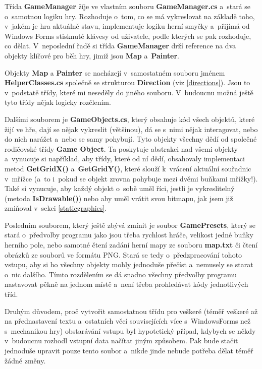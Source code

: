 \documentclass{article}
\begin{document}
Třída \textbf{GameManager} žíje ve vlastním souboru \textbf{GameManager.cs} a~stará se o~samotnou logiku hry. Rozhoduje o~tom, co se má vykreslovat na základě toho, v~jakém je hra aktuálně stavu, implementuje logiku herní smyčky a~přijímá od Windows Forms stisknuté klávesy od uživatele, podle kterých se pak rozhoduje, co dělat. V~neposlední řadě si třída \textbf{GameManager} drží reference na dva objekty klíčové pro běh hry, jimiž jsou \textbf{Map} a~\textbf{Painter}.

Objekty \textbf{Map} a \textbf{Painter} se nacházejí v~samostatném souboru jménem \textbf{HelperClasses.cs} společně se strukturou \textbf{Direction} (viz \ref{directions}). Jsou to v~podstatě třídy, které mi neseděly do jiného souboru. V~budoucnu možná ještě tyto třídy nějak logicky rozčlením. 

Dalšími souborem je \textbf{GameObjects.cs}, který obsahuje kód všech objektů, které žijí ve hře, dají se nějak vykreslit (většinou), dá se s~nimi nějak interagovat, nebo do nich narážet a~nebo se samy pohybují. Tyto objekty všechny dědí od společné rodičovské třídy \textbf{Game Object}. Ta poskytuje abstrakci nad všemi objekty a~vynucuje si například, aby třídy, které od ní dědí, obsahovaly implementaci metod \textbf{GetGridX()} a~\textbf{GetGridY()}, které slouží k~vrácení aktuální souřadnic v~mřížce (a~to i~pokud se objekt zrovna pohybuje mezi dvěmi buňkami mřížky!). Také si vynucuje, aby každý objekt o~sobě uměl říci, jestli je vykreslitelný (metoda \textbf{IsDrawable()}) nebo aby uměl vrátit svou bitmapu, jak jsem již zmiňoval v~sekci \ref{staticgraphics}.

Posledním souborem, který ještě zbývá zmínit je soubor \textbf{GamePresets}, který se stará o~předvolby programu jako jsou třeba rychlost hráče, velikost jedné buňky herního pole, nebo samotné čtení zadání herní mapy ze souboru \textbf{map.txt} či čtení obrázků ze souborů ve formátu PNG. Stará se tedy o~předzpracování tohoto vstupu, aby si ho všechny objekty mohly jednoduše přečíst a~nemusely se starat o~nic dalšího. Tímto rozdělením se dá snadno všechny předvolby programu nastavovat pěkně na jednom místě a~není třeba prohledávat kódy jednotlivých tříd.

Druhým důvodem, proč vytvořit samostatnou třídu pro veškeré (téměř veškeré až na přednastavení textu a~ostatních věcí souvisejících více s~WindowsForms než s~mechanikou hry) obstarávání vstupu byl hypotetický případ, kdybych se někdy v~budoucnu rozhodl vstupní data načítat jiným způsobem. Pak bude stačit jednoduše upravit pouze tento soubor a~nikde jinde nebude potřeba dělat téměř žádné změny.
\end{document}
